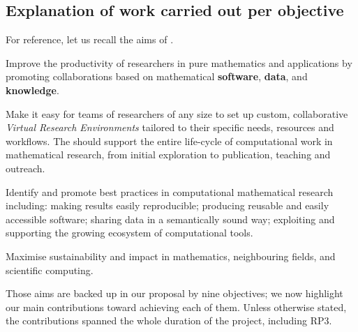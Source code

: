\subsection{Explanation of work carried out per objective}
For reference, let us recall the aims of \ODK.
\begin{compactenum}[\bf {Aim} 1\rm]
\item \label{aim:collaboration} Improve the productivity of
  researchers in pure mathematics and applications by promoting
  collaborations based on mathematical \textbf{software},
  \textbf{data}, and \textbf{knowledge}.
\item \label{aim:vre} Make it easy for teams of researchers of any
  size to set up custom, collaborative \emph{Virtual Research
    Environments} tailored to their specific needs, resources and
  workflows. The \VREs should support the entire life-cycle of
  computational work in mathematical research, from initial
  exploration to publication, teaching and outreach.
\item \label{aim:sharing} Identify and promote best practices in
  computational mathematical research including: making results easily
  reproducible; producing reusable and easily accessible
  software; sharing data in a semantically sound way; exploiting and
  supporting the growing ecosystem of computational tools.
\item \label{aim:impact} Maximise sustainability and impact in
  mathematics, neighbouring fields, and scientific computing.
\end{compactenum}

Those aims are backed up in our proposal by nine objectives; we now
highlight our main contributions toward achieving each of them. Unless
otherwise stated, the contributions spanned the whole duration of the
project, including RP3.

